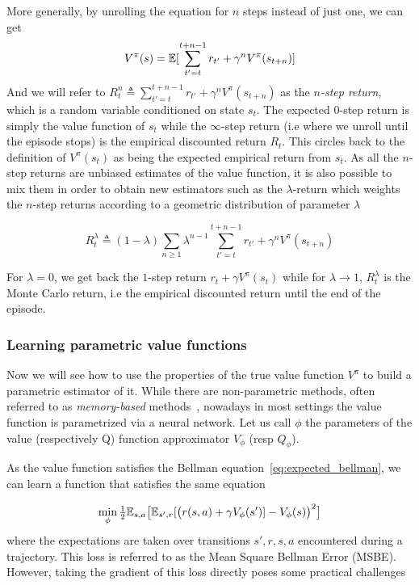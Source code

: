 More generally, by unrolling the equation for $n$ steps instead of just one, we can get
\begin{equation}
      V^\pi(s)  = \mathbb{E} [\sum_{t'=t}^{t+n-1} r_{t'} + \gamma^n V^\pi(s_{t+n})]
\end{equation}
And we will refer to $R^{n}_t \triangleq \sum_{t'=t}^{t+n-1} r_{t'} + \gamma^n
V^\pi(s_{t+n})$ as the \emph{$n$-step return}, which is a random variable
conditioned on state $s_t$. The expected $0$-step return is simply the value function of $s_t$ while the $\infty$-step return (i.e where we unroll until the episode stops) is the empirical discounted return $R_t$. This circles back to the definition of $V^\pi(s_t)$ as being the expected empirical return from $s_t$. As all the $n$-step returns are unbiased estimates of the value function, it is also possible to mix them in order to obtain new estimators such as the $\lambda$-return which weights the $n$-step returns according to a geometric distribution of parameter $\lambda$

\begin{equation}
\label{eq:lambda_return}
    R^\lambda_t \triangleq (1-\lambda) \sum_{n \ge 1} \lambda^{n-1} \sum_{t'=t}^{t+n-1} r_{t'} + \gamma^n V^\pi(s_{t+n})
\end{equation}

For $\lambda=0$, we get back the $1$-step return $r_t + \gamma V^\pi(s_t)$ while for $\lambda \to 1$, $R^\lambda_t$ is the Monte Carlo return, i.e the empirical discounted return until the end of the episode.


\subsubsection{Learning parametric value functions}
\label{subsec:td}

Now we will see how to use the properties of the true value function $V^\pi$ to build a parametric estimator of it. While there are non-parametric methods, often referred to as \emph{memory-based} methods~\citep{atkeson1997locally}, nowadays in most settings the value function is parametrized via a neural network. Let us call $\phi$ the parameters of the value (respectively Q) function approximator $V_\phi$ (resp $Q_\phi$).

As the value function satisfies the Bellman equation~\cref{eq:expected_bellman}, we can learn a function that satisfies the same equation

\begin{equation}
\label{eq:MSBE}
    \min_\phi \tfrac{1}{2} \mathbb{E}_{s, a} \big[ \mathbb{E}_{s', r}[ \big( r(s,a) + \gamma V_\phi(s')] - V_\phi(s) \big)^2\big]
\end{equation}
where the expectations are taken over transitions $s', r, s, a$ encountered during a trajectory. This loss is referred to as the Mean Square Bellman Error (MSBE). %
However, taking the gradient of this loss directly poses some practical challenges

